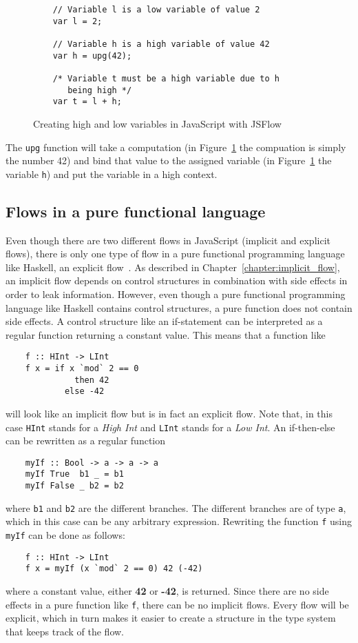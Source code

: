 \begin{figure}[h]
  \begin{verbatim}
    // Variable l is a low variable of value 2
    var l = 2;

    // Variable h is a high variable of value 42
    var h = upg(42);

    /* Variable t must be a high variable due to h
       being high */
    var t = l + h;
  \end{verbatim}
  \caption{Creating high and low variables in JavaScript with JSFlow}
  \label{fig:upg}
\end{figure}
The {\tt upg} function will take a computation (in Figure~\ref{fig:upg} the compuation is simply the number 42) and bind that value to the assigned variable (in Figure~\ref{fig:upg} the variable {\tt h}) and put the variable in a high context.

\subsection{Flows in a pure functional language}
Even though there are two different flows in JavaScript (implicit and explicit flows), there is only one type of flow in a pure functional programming language like Haskell, an explicit flow~\cite{seclib}. As described in Chapter~\ref{chapter:implicit_flow}, an implicit flow depends on control structures in combination with side effects in order to leak information. However, even though a pure functional programming language like Haskell contains control structures, a pure function does not contain side effects. A control structure like an if-statement can be interpreted as a regular function returning a constant value. This means that a function like
\begin{verbatim}
    f :: HInt -> LInt
    f x = if x `mod` 2 == 0
              then 42
            else -42
\end{verbatim}
will look like an implicit flow but is in fact an explicit flow. Note that, in this case {\tt HInt} stands for a \emph{High Int} and {\tt LInt} stands for a \emph{Low Int}. An if-then-else can be rewritten as a regular function~\cite{if-then-else}
\begin{verbatim}
    myIf :: Bool -> a -> a -> a
    myIf True  b1 _ = b1
    myIf False _ b2 = b2
\end{verbatim}
where {\tt b1} and {\tt b2} are the different branches. The different branches are of type {\tt a}, which in this case can be any arbitrary expression. Rewriting the function {\tt f} using {\tt myIf} can be done as follows:
\begin{verbatim}
    f :: HInt -> LInt
    f x = myIf (x `mod` 2 == 0) 42 (-42)
\end{verbatim}
where a constant value, either \textbf{42} or \textbf{-42}, is returned. Since there are no side effects in a pure function like {\tt f}, there can be no implicit flows. Every flow will be explicit, which in turn makes it easier to create a structure in the type system that keeps track of the flow.

